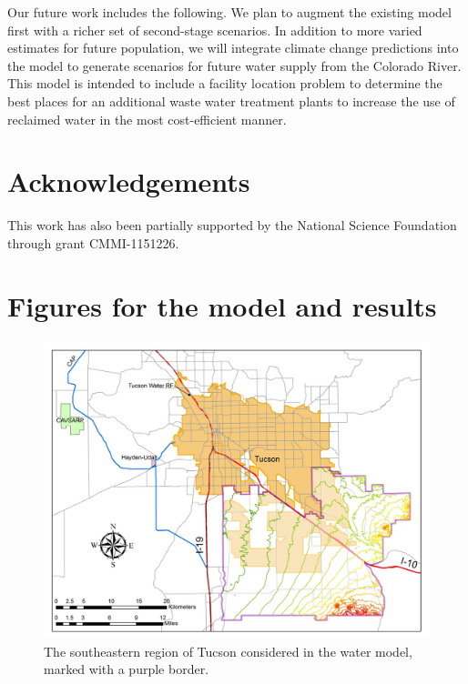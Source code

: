 \documentclass[12pt]{amsart}
\begin{document}
Our future work includes the following. We plan to augment the existing model first with a richer set of second-stage scenarios.
In addition to more varied estimates for future population, we will integrate climate change predictions into the model to generate scenarios for future water supply from the Colorado River. 
This model is intended to include a facility location problem to determine the best places for an additional waste water treatment plants to increase the use of reclaimed water in the most cost-efficient manner.

\section*{Acknowledgements}
This work has also been partially supported by the National Science Foundation through grant CMMI-1151226.




\pagebreak

\appendix

\section{Figures for the model and results}
\label{app:figures}

\begin{figure}[!ht]
	\centering
	\includegraphics[width=.7\textwidth]{images/tucson_elevation}
	\caption{
		The southeastern region of Tucson considered in the water model, marked with a purple border.
	}
	\label{fig:tucson_map}
\end{figure}
\end{document}
